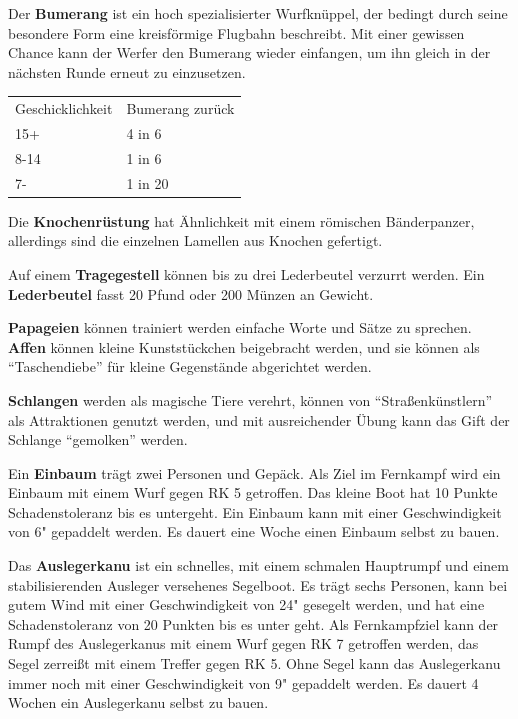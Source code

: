 \documentclass[11pt]{wbzine}
\begin{document}
\begin{multicols}{2}
Der \textbf{Bumerang} ist ein hoch spezialisierter Wurfknüppel, der
bedingt durch seine besondere Form eine kreisförmige Flugbahn
beschreibt. Mit einer gewissen Chance kann der Werfer den Bumerang
wieder einfangen, um ihn gleich in der nächsten Runde erneut zu
einzusetzen.

\begin{tabularx}{\columnwidth}{lZ}
    Geschicklichkeit & Bumerang zurück \\
    15+ & 4 in 6 \\
    8-14 & 1 in 6 \\
    7- & 1 in 20 \\
\end{tabularx}

Die \textbf{Knochenrüstung} hat Ähnlichkeit mit einem römischen
Bänderpanzer, allerdings sind die einzelnen Lamellen aus Knochen
gefertigt.

Auf einem \textbf{Tragegestell} können bis zu drei Lederbeutel
verzurrt werden. Ein \textbf{Lederbeutel} fasst 20 Pfund oder 200
Münzen an Gewicht.

\textbf{Papageien} können trainiert werden einfache Worte und Sätze
zu sprechen. \textbf{Affen} können kleine Kunststückchen beigebracht
werden, und sie können als ``Taschendiebe'' für kleine Gegenstände
abgerichtet werden.

\textbf{Schlangen} werden als magische Tiere verehrt, können von
``Straßenkünstlern'' als Attraktionen genutzt werden, und mit
ausreichender Übung kann das Gift der Schlange ``gemolken'' werden.

Ein \textbf{Einbaum} trägt zwei Personen und Gepäck. Als Ziel im
Fernkampf wird ein Einbaum mit einem Wurf gegen RK 5 getroffen. Das
kleine Boot hat 10 Punkte Schadenstoleranz bis es untergeht. Ein
Einbaum kann mit einer Geschwindigkeit von 6" gepaddelt werden. Es
dauert eine Woche einen Einbaum selbst zu bauen.

Das \textbf{Auslegerkanu} ist ein schnelles, mit einem schmalen
Hauptrumpf und einem stabilisierenden Ausleger versehenes Segelboot.
Es trägt sechs Personen, kann bei gutem Wind mit einer
Geschwindigkeit von 24" gesegelt werden, und hat eine
Schadenstoleranz von 20 Punkten bis es unter geht. Als Fernkampfziel
kann der Rumpf des Auslegerkanus mit einem Wurf gegen RK 7 getroffen
werden, das Segel zerreißt mit einem Treffer gegen RK 5. Ohne Segel
kann das Auslegerkanu immer noch mit einer Geschwindigkeit von 9"
gepaddelt werden. Es dauert 4 Wochen ein Auslegerkanu selbst zu
bauen.


\end{multicols}
\end{document}
